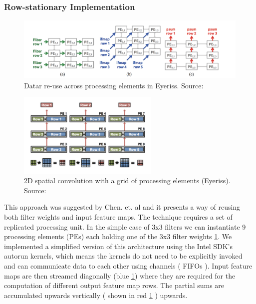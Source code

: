 \subsubsection{Row-stationary Implementation} \label{rowimpl}

\begin{figure}[h]
\centering
\includegraphics[width=1.0\textwidth]{Figures/eyeriss}
\decoRule
\caption[Data Re-use in Eyeriss]{ Datar re-use across processing elements in Eyeriss. Source: \cite{eyeriss}}
\label{fig:eyeriss}
\end{figure}

\begin{figure}[h]
\centering
\includegraphics[width=0.6\textwidth]{Figures/eyeriss2}
\decoRule
\caption[2D Spatial Convolution]{ 2D spatial convolution with a grid of processing elements (Eyeriss). Source: \cite{sze2017efficient}}
\label{fig:eyeriss2}
\end{figure}

This approach was suggested by Chen. et. al \cite{eyeriss} and it presents a way of reusing both filter weights and input feature maps. The technique requires a set of replicated processing unit. In the simple case of 3x3 filters we can instantiate 9 processing elements (PEs) each holding one of the 3x3 filter weights \ref{fig:eyeriss}. We implemented a simplified version of this architecture using the Intel SDK’s autorun kernels, which means the kernels do not need to be explicitly invoked and can communicate data to each other using channels ( FIFOs ). Input feature maps are then streamed diagonally (blue \ref{fig:eyeriss}) where they are required for the computation of different output feature map rows. The partial sums are accumulated upwards vertically ( shown in red \ref{fig:eyeriss} ) upwards. 

